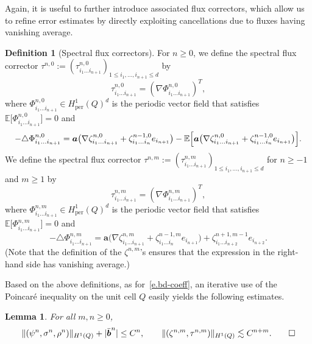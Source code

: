 \documentclass[JEP,XML,SOM,Unicode,published]{cedram}
\theoremstyle{plain}
\newtheorem{lem0}[theor0]{Lemma}
\newenvironment{lem}
{\renewcommand{\qedsymbol}{$\lozenge$}\pushQED{\qed}\begin{lem0}}
{\popQED\end{lem0}}
\theoremstyle{definition}
\newtheorem{defin0}[theor0]{Definition}
\newenvironment{defin}
{\renewcommand{\qedsymbol}{$\lozenge$}\pushQED{\qed}\begin{defin0}}
{\popQED\end{defin0}}
\numberwithin{equation}{section}
\newcommand{\per}{{\operatorname{per}}}
\newcommand{\ee}{e}
\newcommand{\Aa}{\boldsymbol a}
\newcommand{\bb}{{\boldsymbol b}}
\newcommand{\Bexpec}[1]{\mathbb{E}\Bigl[ #1 \Bigr]}
\newcommand{\expecm}[1]{\mathbb{E}\bigl[ #1 \bigr]}\let\bexpec\expecm
\begin{document}
Again, it is useful to further introduce associated flux correctors, which allow {us} to refine error estimates by directly exploiting cancellations due to fluxes having vanishing average.

\begin{defin}[Spectral flux correctors]\label{def:spec-fluc-corr-zeta}
For $n\ge0$, we define the spectral flux corrector $\tau^{n,0}:=(\tau^{n,0}_{i_1\ldots i_{n+1}})_{1\le i_1,\ldots,i_{n+1}\le d}$ by\vspace*{-3pt}
\[\tau_{i_1\ldots i_{n+1}}^{n,0}=(\nabla\Phi_{i_1\ldots i_{n+1}}^{n,0})^T,\]
where $\Phi^{n,0}_{i_1\ldots i_{n+1}}\in H^1_\per(Q)^d$ is the periodic vector field that satisfies $\expecm{\Phi_{i_1\ldots i_{n+1}}^{n,0}}=0$ and\vspace*{-3pt}
\[-\triangle\Phi^{n,0}_{i_1\ldots i_{n+1}}=\Aa\big(\nabla\zeta^{n,0}_{i_1\ldots i_{n+1}}+\zeta^{n-1,0}_{i_1\ldots i_{n}}\ee_{i_{n+1}}\big)-\Bexpec{\Aa\big(\nabla\zeta^{n,0}_{i_1\ldots i_{n+1}}+\zeta^{n-1,0}_{i_1\ldots i_{n}}\ee_{i_{n+1}}\big)}.\]
We define the spectral flux corrector $\tau^{n,m}:=(\tau^{n,m}_{i_1\ldots i_{n+1}})_{1\le i_1,\ldots,i_{n+1}\le d}$ for $n\ge-1$ and $m\ge1$ by\vspace*{-3pt}
\[\tau_{i_1\ldots i_{n+1}}^{n,m}=(\nabla\Phi_{i_1\ldots i_{n+1}}^{n,m})^T,\]
where $\Phi^{n,m}_{i_1\ldots i_{n+1}}\in H^1_\per(Q)^d$ is the periodic vector field that satisfies $\expecm{\Phi_{i_1\ldots i_{n+1}}^{n,m}}=0$ and\vspace*{-3pt}
\begin{equation*}
-\triangle\Phi^{n,m}_{i_1\ldots i_{n+1}}=\Aa\big(\nabla\zeta^{n,m}_{i_1\ldots i_{n+1}}+\zeta^{n-1,m}_{i_1\ldots i_{n}}\ee_{i_{n+1}}\big)+\zeta_{i_1\ldots i_{n+2}}^{n+1,m-1}\ee_{i_{n+2}}.
\end{equation*}
(Note that the definition of the $\zeta^{n,m}$'s ensures that the expression in the right-hand side has vanishing average.)
\end{defin}

Based on the above definitions, as for~\eqref{e.bd-coeff}, an iterative use of the Poincaré inequality on the unit cell $Q$ easily yields the following estimates.

\begin{lem}\label{lem:cor-est-per}
For all $m,n\ge0$,\vspace*{-3pt}
\begin{equation}\label{eq:cor-est-per}
\|(\psi^n,\sigma^n,\rho^n)\|_{H^1(Q)} +|\bar \bb^n|\le C^n,\qquad \|(\zeta^{n,m},\tau^{n,m})\|_{H^1(Q)}\lesssim C^{n+m}.\qedhere
\end{equation}
\end{lem}
\end{document}
